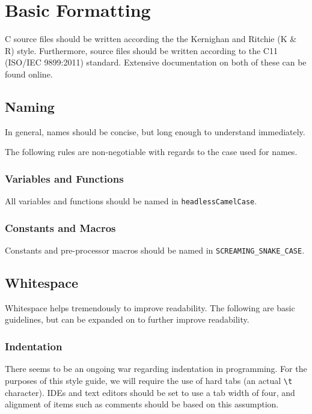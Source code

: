 \documentclass[11pt]{book}
\begin{document}
\chapter{Basic Formatting}\label{basic-formatting}

C source files should be written according the the Kernighan and Ritchie
(K \& R) style. Furthermore, source files should be written according to
the C11 (ISO/IEC 9899:2011) standard. Extensive documentation on both of
these can be found online.

\section{Naming}\label{naming}

In general, names should be concise, but long enough to understand
immediately.

The following rules are non-negotiable with regards to the case used for
names.

\subsection{Variables and Functions}\label{variables-and-functions}

All variables and functions should be named in
\texttt{headlessCamelCase}.

\subsection{Constants and Macros}\label{constants-and-macros}

Constants and pre-processor macros should be named in
\texttt{SCREAMING\_SNAKE\_CASE}.

\section{Whitespace}\label{whitespace}

Whitespace helps tremendously to improve readability. The following are
basic guidelines, but can be expanded on to further improve readability.

\subsection{Indentation}\label{indentation}

There seems to be an ongoing war regarding indentation in programming.
For the purposes of this style guide, we will require the use of hard
tabs (an actual \texttt{\textbackslash{}t} character). IDEs and text
editors should be set to use a tab width of four, and alignment of items
such as comments should be based on this assumption.
\end{document}
